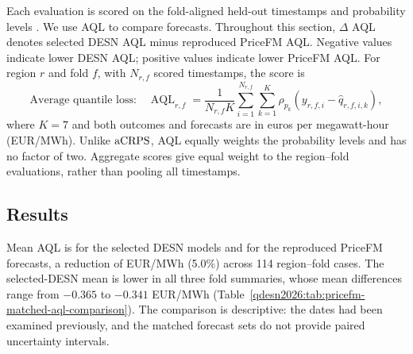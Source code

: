 Each evaluation is scored on the fold-aligned held-out timestamps and
probability levels \PricefmFullPaperQuantiles. We use AQL to compare forecasts.
Throughout this section,
\(\Delta\) AQL denotes selected DESN AQL minus reproduced PriceFM AQL.
Negative values indicate lower DESN AQL; positive values indicate lower
PriceFM AQL.
For region \(r\) and fold \(f\), with \(N_{r,f}\) scored timestamps, the score is
\begin{equation}
\text{Average quantile loss:}\quad
\operatorname{AQL}_{r,f}
=\frac{1}{N_{r,f}K}\sum_{i=1}^{N_{r,f}}\sum_{k=1}^{K}
\rho_{p_k}\!\left(y_{r,f,i}-\widehat q_{r,f,i,k}\right),
\label{qdesn2026:eq:pricefm-aql-main}
\end{equation}
where \(K=7\) and both outcomes and forecasts are in euros per megawatt-hour
(EUR/MWh).
Unlike \(\operatorname{aCRPS}\), AQL equally weights the probability levels and has no
factor of two. Aggregate scores give equal weight to the
\PricefmFullRegionFolds{} region--fold evaluations, rather than pooling all
timestamps.

\subsection{Results}

Mean AQL is \PricefmFullMeanSelectedAql{} for the selected DESN models and
\PricefmFullMeanPricefmAql{} for the reproduced PriceFM forecasts, a reduction
of \PricefmFullMeanReductionAql{} EUR/MWh (5.0\%) across 114 region--fold
cases. The selected-DESN mean is lower in all three fold summaries, whose mean
differences range from
\(-0.365\) to \(-0.341\) EUR/MWh
(Table~\ref{qdesn2026:tab:pricefm-matched-aql-comparison}). The comparison is
descriptive: the dates had been examined previously, and the matched forecast
sets do not provide paired uncertainty intervals.

\begin{table}[!htbp]
\centering
\caption[Electricity-price forecast comparison]{Electricity-price forecast comparison over the three consecutive
test blocks of 2025. DESN denotes the regional validation choice among
Q--DESN and MQ--DESN under AL and exAL with RHS priors. PriceFM forecasts are
reproduced from the authors' public code. Scores weight region--fold cases
equally; \(\Delta\) is DESN minus PriceFM, in EUR/MWh.}
\label{qdesn2026:tab:pricefm-matched-aql-comparison}

\end{table}


